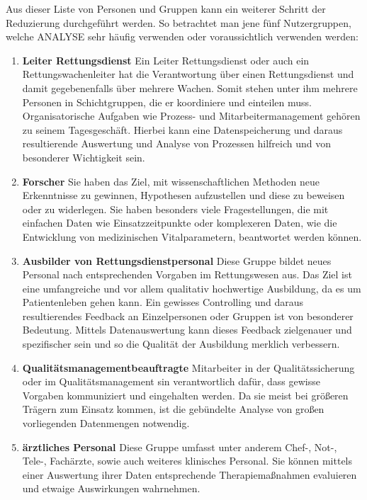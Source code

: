 Aus dieser Liste von Personen und Gruppen kann ein weiterer Schritt der Reduzierung durchgeführt werden. 
So betrachtet man jene fünf Nutzergruppen, welche \gls{ANALYSE} sehr häufig verwenden oder voraussichtlich verwenden werden:
\begin{enumerate}
\item \textbf{Leiter Rettungsdienst} Ein Leiter Rettungsdienst oder auch ein Rettungswachenleiter hat die Verantwortung über einen Rettungsdienst und damit gegebenenfalls über mehrere Wachen.
Somit stehen unter ihm mehrere Personen in Schichtgruppen, die er koordiniere und einteilen muss.
Organisatorische Aufgaben wie Prozess- und Mitarbeitermanagement gehören zu seinem Tagesgeschäft.
Hierbei kann eine Datenspeicherung und daraus resultierende Auswertung und Analyse von Prozessen hilfreich und von besonderer Wichtigkeit sein.
\item \textbf{Forscher} Sie haben das Ziel, mit wissenschaftlichen Methoden neue Erkenntnisse zu gewinnen, Hypothesen aufzustellen und diese zu beweisen oder zu widerlegen.
Sie haben besonders viele Fragestellungen, die mit einfachen Daten wie Einsatzzeitpunkte oder komplexeren Daten, wie  die Entwicklung von medizinischen Vitalparametern, beantwortet werden können.
\item \textbf{Ausbilder von Rettungsdienstpersonal} Diese Gruppe bildet neues Personal nach entsprechenden Vorgaben im Rettungswesen aus.
Das Ziel ist eine umfangreiche und vor allem qualitativ hochwertige Ausbildung, da es um Patientenleben gehen kann.
Ein gewisses Controlling und daraus resultierendes Feedback an Einzelpersonen oder Gruppen ist von besonderer Bedeutung.
Mittels Datenauswertung kann dieses Feedback zielgenauer und spezifischer sein und so die Qualität der Ausbildung merklich verbessern.
\item \textbf{Qualitätsmanagementbeauftragte} Mitarbeiter in der Qualitätssicherung oder im Qualitätsmanagement sin verantwortlich dafür, dass gewisse Vorgaben kommuniziert und eingehalten werden.
Da sie meist bei größeren Trägern zum Einsatz kommen, ist die gebündelte Analyse von großen vorliegenden Datenmengen notwendig.
\item \textbf{ärztliches Personal} Diese Gruppe umfasst unter anderem Chef-, Not-, Tele-, Fachärzte, sowie auch weiteres klinisches Personal.
Sie können mittels einer Auswertung ihrer Daten entsprechende Therapiemaßnahmen evaluieren und etwaige Auswirkungen wahrnehmen.
\end{enumerate}


